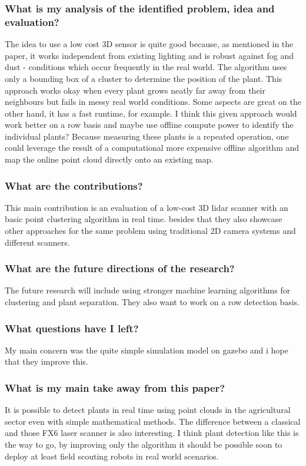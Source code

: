     \subsubsection*{What is my analysis of the identified problem, idea and evaluation?}
    The idea to use a low cost 3D sensor is quite good because, as mentioned in the paper, it works independent from 
    existing lighting and is robust against fog and dust - conditions which occur frequently in the real world.
    The algorithm uses only a bounding box of a cluster to determine the position of the plant. This approach works okay 
    when every plant grows neatly far away from their neighbours but fails in messy real world conditions.
    Some aspects are great on the other hand, it has a fast runtime, for example. I think this given approach would work 
    better on a row basis and maybe use offline compute power to identify the individual plants? 
    Because measuring these plants is a repeated operation, one could leverage the result of a computational more expensive
    offline algorithm and map the online point cloud directly onto an existing map.
    \subsubsection*{What are the contributions?}
    This main contribution is an evaluation of a low-cost 3D lidar scanner with an basic point clustering algorithm in real time. besides
    that they also showcase other approaches for the same problem using traditional 2D camera systems and different scanners.
    
    \subsubsection*{What are the future directions of the research?}
    The future research will include using stronger machine learning algorithms for clustering and plant separation. They also
    want to work on a row detection basis.
    \subsubsection*{What questions have I left?}
    My main concern was the quite simple simulation model on gazebo and i hope that they improve this.
    \subsubsection*{What is my main take away from this paper?}
    It is possible to detect plants in real time using point clouds in the agricultural sector even with 
    simple mathematical methods. The difference between a classical and those FX6 laser scanner is also interesting.
    I think plant detection like this is the way to go, by improving only the algorithm it should be possible
    soon to deploy at least field scouting robots in real world scenarios. 
    
